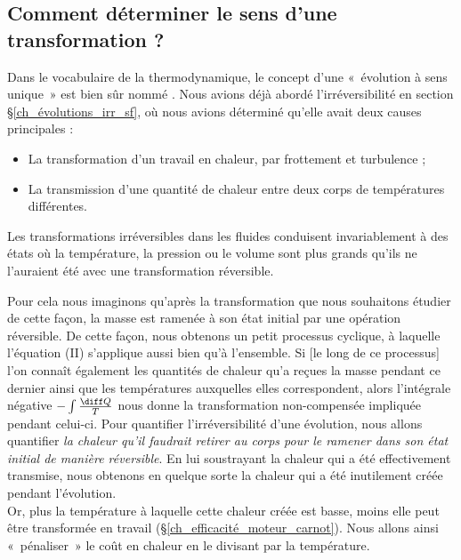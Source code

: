 	\subsection{Comment déterminer le sens d’une transformation ?}
	
		Dans le vocabulaire de la thermodynamique, le concept d’une «~évolution à sens unique~» est bien sûr nommé . Nous avions déjà abordé l'irréversibilité en section \S\ref{ch_évolutions_irr_sf}, où nous avions déterminé qu’elle avait deux causes principales :
			\begin{itemize}
				\item La transformation d’un travail en chaleur, par frottement et turbulence ;
				\item La transmission d’une quantité de chaleur entre deux corps de températures différentes.
			\end{itemize}
		
		Les transformations irréversibles dans les fluides conduisent invariablement à des états où la température, la pression ou le volume sont plus grands qu’ils ne l’auraient été avec une transformation réversible. 
		
			Pour cela nous imaginons qu’après la transformation que nous souhaitons étudier de cette façon, la masse est ramenée à son état initial par une opération réversible. De cette façon, nous obtenons un petit processus cyclique, à laquelle l’équation (II) s’applique aussi bien qu’à l’ensemble. Si [le long de ce processus] l’on connaît également les quantités de chaleur qu’a reçues la masse pendant ce dernier ainsi que les températures auxquelles elles correspondent, alors l’intégrale négative $-\int \frac{\diff Q}{T}$ nous donne la transformation non-compensée impliquée pendant celui-ci.
		Pour quantifier l’irréversibilité d’une évolution, nous allons quantifier \emph{la chaleur qu’il faudrait retirer au corps pour le ramener dans son état initial de manière réversible}. En lui soustrayant la chaleur qui a été effectivement transmise, nous obtenons en quelque sorte la chaleur qui a été inutilement créée pendant l’évolution.\\
		Or, plus la température à laquelle cette chaleur créée est basse, moins elle peut être transformée en travail (\S\ref{ch_efficacité_moteur_carnot}). Nous allons ainsi «~pénaliser~» le coût en chaleur en le divisant par la température.
		
